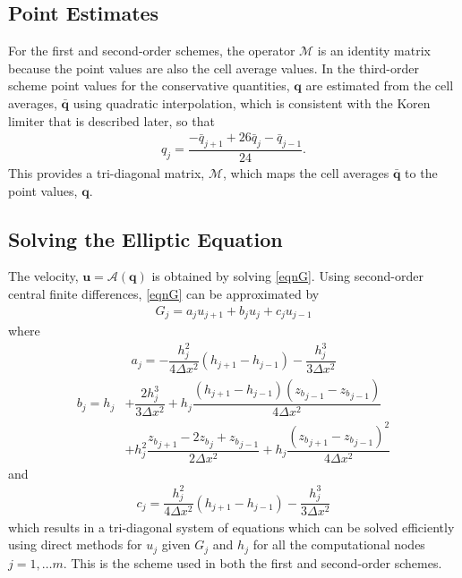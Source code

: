 \documentclass[preprint,sort&compress,1p]{article}
\begin{document}
\subsection{Point Estimates}

For the first and second-order schemes, the operator $\mathcal{M}$ is an identity matrix because the point values are also the cell average values. In the third-order scheme point values for the conservative quantities, $\mathbf{q}$ are estimated from the cell averages, $\bar{\mathbf{q}}$ using quadratic interpolation, which is consistent with the Koren limiter that is described later, so that
\begin{align}
q_j =  \dfrac{- \bar{q}_{j+1} + 26 \bar{q}_j - \bar{q}_{j-1}}{24}.
\label{eq:cell_to_node}
\end{align}
This provides a tri-diagonal matrix, $\mathcal{M}$, which maps the cell averages  $\bar{\mathbf{q}}$ to the point values, $\mathbf{q}$.

\subsection{Solving the Elliptic Equation}

The velocity, $\mathbf{u} = \mathcal{A}(\mathbf{q})$ is obtained by solving \eqref{eqnG}. Using second-order central finite differences, \eqref{eqnG} can be approximated by
\begin{gather}
G_j = a_j u_{j+1} + b_j u_j + c_j u_{j-1}
\label{eq:fd_second-order_elliptic}
\end{gather}
where
\begin{gather}
a_j = - \dfrac{h_j^2}{4 \Delta x^2} \left ( h_{j+1} - h_{j-1} \right ) - \dfrac{h^3_j}{3 \Delta x^2}
\end{gather}
\begin{align}
b_j = h_j  &+ \dfrac{2 h^3_j}{3 \Delta x^2} + h_j \dfrac{(h_{j+1} - h_{j-1} )({z_b}_{j-1} - {z_b}_{j-1} )}{4 \Delta x^2} \nonumber \\ &+ h_j^2 \dfrac{{z_b}_{j+1} - 2 {z_b}_j + {z_b}_{j-1} }{2 \Delta x^2} + h_j \dfrac{({z_b}_{j+1} - {z_b}_{j-1} )^2}{4 \Delta x^2}
\end{align}
and
\begin{gather}
c_j = \dfrac{h_j^2}{4 \Delta x^2} \left ( h_{j+1} - h_{j-1} \right ) - \dfrac{h^3_j}{3 \Delta x^2}
\end{gather}
which results in a tri-diagonal system of equations which can be solved efficiently using direct methods for $u_j$ given $G_j$ and $h_j$ for all the computational nodes $j = 1, \dots m$. This is the scheme used in both the first and second-order schemes.
\end{document}
